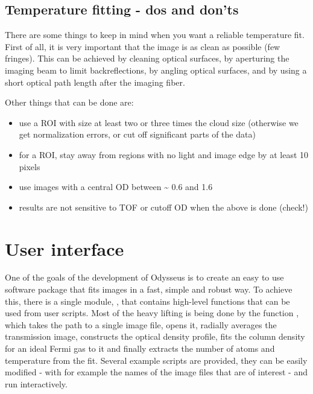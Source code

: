 \documentclass[letterpaper,10pt,english]{manual}
\begin{document}
\subsection{Temperature fitting - dos and don'ts}

There are some things to keep in mind when you want a reliable temperature fit. First of all, it is very important that the image is as clean as possible (few fringes). This can be achieved by cleaning optical surfaces, by aperturing the imaging beam to limit backreflections, by angling optical surfaces, and by using a short optical path length after the imaging fiber.

Other things that can be done are:
\begin{itemize}
\item {} 
use a ROI with size at least two or three times the cloud size (otherwise we get normalization errors, or cut off significant parts of the data)

\item {} 
for a ROI, stay away from regions with no light and image edge by at least 10 pixels

\item {} 
use images with a central OD between \textasciitilde{} 0.6 and 1.6

\item {} 
results are not sensitive to TOF or cutoff OD when the above is done (check!)

\end{itemize}

\resetcurrentobjects
\hypertarget{--doc-fitfermions}{}

\section{User interface}

One of the goals of the development of Odysseus is to create an easy to use software package that fits images in a fast, simple and robust way. To achieve this, there is a single module, , that contains high-level functions that can be used from user scripts. Most of the heavy lifting is being done by the function , which takes the path to a single image file, opens it, radially averages the transmission image, constructs the optical density profile, fits the column density for an ideal Fermi gas to it and finally extracts the number of atoms and temperature from the fit. Several example scripts are provided, they can be easily modified - with for example the names of the image files that are of interest - and run interactively.
\end{document}
